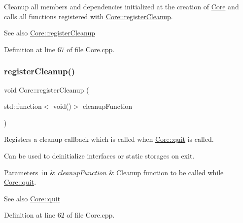 Cleanup all members and dependencies initialized at the creation of \hyperlink{classbkengine_1_1Core}{Core} and calls all functions registered with \hyperlink{classbkengine_1_1Core_a629951e5dec1e2c3f387790bd9ebb920}{Core\+::register\+Cleanup}. 

\begin{DoxySeeAlso}{See also}
\hyperlink{classbkengine_1_1Core_a629951e5dec1e2c3f387790bd9ebb920}{Core\+::register\+Cleanup} 
\end{DoxySeeAlso}


Definition at line 67 of file Core.\+cpp.

\mbox{\label{classbkengine_1_1Core_a629951e5dec1e2c3f387790bd9ebb920}} 
\subsubsection{\texorpdfstring{register\+Cleanup()}{registerCleanup()}}
{\footnotesize\ttfamily void Core\+::register\+Cleanup (\begin{DoxyParamCaption}\item[{std\+::function$<$ void()$>$}]{cleanup\+Function }\end{DoxyParamCaption})\hspace{0.3cm}{\ttfamily [static]}}



Registers a cleanup callback which is called when \hyperlink{classbkengine_1_1Core_a7d6ca7943e0aa8d8d33a151fdc131f6e}{Core\+::quit} is called. 

Can be used to deinitialize interfaces or static storages on exit.


\begin{DoxyParams}[1]{Parameters}
\mbox{\tt in}  & {\em cleanup\+Function} & Cleanup function to be called while \hyperlink{classbkengine_1_1Core_a7d6ca7943e0aa8d8d33a151fdc131f6e}{Core\+::quit}.\\
\hline
\end{DoxyParams}
\begin{DoxySeeAlso}{See also}
\hyperlink{classbkengine_1_1Core_a7d6ca7943e0aa8d8d33a151fdc131f6e}{Core\+::quit} 
\end{DoxySeeAlso}


Definition at line 62 of file Core.\+cpp.

\mbox{\label{classbkengine_1_1Core_a88b8c671689df472845515953b5b7b2d}} 
